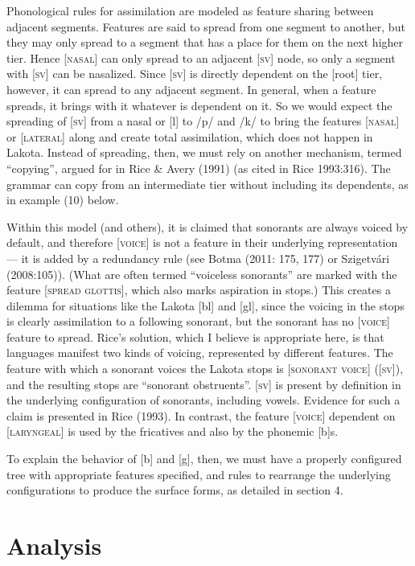 \documentclass[output=paper]{LSP/langsci}
\begin{document}
Phonological rules for assimilation are modeled as feature sharing between adjacent segments. Features are said to spread from one segment to another, but they may only spread to a segment that has a place for them on the next higher tier. Hence [\textsc{nasal}] can only spread to an adjacent [\textsc{sv}] node, so only a segment with [\textsc{sv}] can be nasalized. Since [\textsc{sv}] is directly dependent on the [root] tier, however, it can spread to any adjacent segment. In general, when a feature spreads, it brings with it whatever is dependent on it. So we would expect the spreading of [\textsc{sv}] from a nasal or [l] to /p/ and /k/ to bring the features [\textsc{nasal}] or [\textsc{lateral}] along and create total assimilation, which does not happen in Lakota. Instead of spreading, then, we must rely on another mechanism, termed ``copying'', argued for in Rice \& Avery (1991) (as cited in Rice 1993:316). The grammar can copy from an intermediate tier without including its dependents, as in example (10) below.

Within this model (and others), it is claimed that sonorants are always voiced by default, and therefore [\textsc{voice}] is not a feature in their underlying representation --- it is added by a redundancy rule (see Botma (2011: 175, 177) or Szigetv\'ari (2008:105)). (What are often termed ``voiceless sonorants'' are marked with the feature [\textsc{spread glottis}], which also marks aspiration in stops.) This creates a dilemma for situations like the Lakota [bl] and [gl], since the voicing in the stops is clearly assimilation to a following sonorant, but the sonorant has no [\textsc{voice}] feature to spread. Rice's solution, which I believe is appropriate here, is that languages manifest two kinds of voicing, represented by different features. The feature with which a sonorant voices the Lakota stops is [\textsc{sonorant voice}] ([\textsc{sv}]), and the resulting stops are ``sonorant obstruents''. [\textsc{sv}] is present by definition in the underlying configuration of sonorants, including vowels. Evidence for such a claim is presented in Rice (1993). In contrast, the feature [\textsc{voice}] dependent on [\textsc{laryngeal}] is used by the fricatives and also by the phonemic [b]s.

To explain the behavior of [b] and [g], then, we must have a properly configured tree with appropriate features specified, and rules to rearrange the underlying configurations to produce the surface forms, as detailed in section 4.

\section{Analysis}
\end{document}
